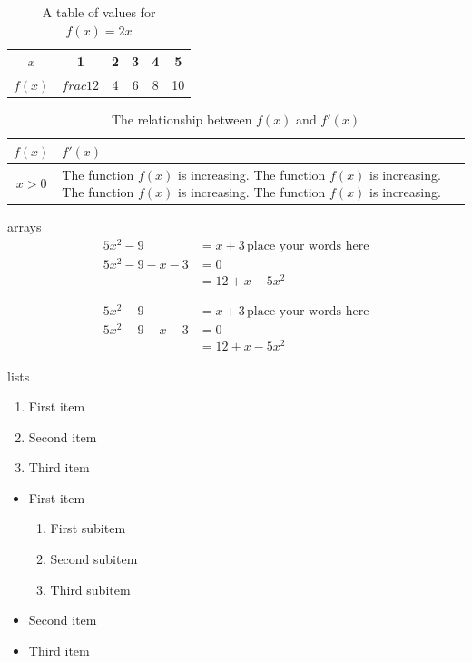 \documentclass[10pt, letterpaper]{article}
\begin{document}
\begin{table}[H]
\centering
\def\arraystretch{1.2}
\begin{tabular}{|c||c|c|c|c|c|}
\hline
$x$ & 1 & 2 & 3 & 4 & 5 \\ \hline
$f(x)$ & $frac{1}{2}$ & 4 & 6 & 8 & 10 \\ \hline
\end{tabular}
\caption{A table of values for $f(x)=2x$}
\end{table}

\begin{table}[H]
\centering
\def\arraystretch{1.2}
\caption{The relationship between $f(x)$ and $f'(x)$}
\begin{tabular}{|c|p{3in}|}
\hline
$f(x)$ & $f'(x)$ \\ \hline
$x > 0$ & The function $f(x)$ is increasing. The function $f(x)$ is increasing. The function $f(x)$ is increasing. The function $f(x)$ is increasing. \\ \hline
\end{tabular}
\end{table}

arrays
\begin{align}
    5x^2-9 &= x+3 \, \text{place your words here} \\
    5x^2-9 - x - 3 &= 0 \\
    &= 12 + x - 5x^2
\end{align}

\begin{align*}
    5x^2-9 &= x+3 \, \text{place your words here} \\
    5x^2-9 - x - 3 &= 0 \\
    &= 12 + x - 5x^2
\end{align*}


lists
\begin{enumerate}
    \item First item
    \item Second item
    \item Third item
\end{enumerate}

\vspace{1cm}

\begin{itemize}
    \item First item
    \begin{enumerate}
        \item First subitem
        \item Second subitem
        \item Third subitem
    \end{enumerate}
    \item Second item
    \item Third item
\end{itemize}
\end{document}
